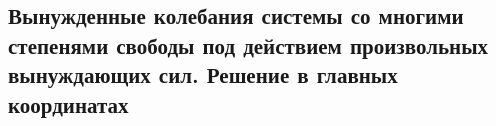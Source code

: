 

\subsection{Вынужденные колебания системы со многими степенями свободы под действием произвольных вынуждающих сил. Решение в главных координатах}




